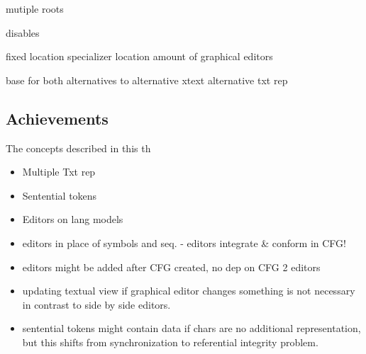 mutiple roots

disables


fixed location
specializer location
amount of graphical editors





base for both alternatives to alternative 
xtext alternative txt rep






\subsection{Achievements}
The concepts described in this th
\begin{itemize}
	\item Multiple Txt rep
	\item Sentential tokens
	\item Editors on lang models
	\item editors in place of symbols and seq. - editors integrate \& conform in CFG!
	\item editors might be added after CFG created, no dep on CFG 2 editors
	\item updating textual view if graphical editor changes something is not necessary in contrast to side by side editors.
	\item sentential tokens might contain data if chars are no additional representation, but this shifts from synchronization to referential integrity problem.
\end{itemize}

